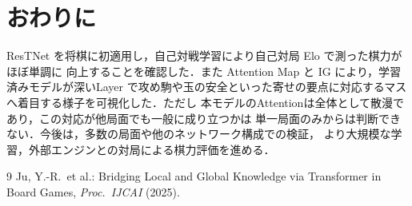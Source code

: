 \documentclass[a4paper,10pt,twocolumn]{ltjsarticle}
\begin{document}
\section{おわりに}
ResTNet を将棋に初適用し，自己対戦学習により自己対局 Elo で測った棋力がほぼ単調に
向上することを確認した．また Attention Map と IG により，学習済みモデルが深いLayer
で攻め駒や玉の安全といった寄せの要点に対応するマスへ着目する様子を可視化した．ただし
本モデルのAttentionは全体として散漫であり，この対応が他局面でも一般に成り立つかは
単一局面のみからは判断できない．今後は，多数の局面や他のネットワーク構成での検証，
より大規模な学習，外部エンジンとの対局による棋力評価を進める．

\begin{thebibliography}{9}
\small
{} Ju, Y.-R.\ et al.: Bridging Local and Global Knowledge via
  Transformer in Board Games, \textit{Proc.\ IJCAI} (2025).
\end{thebibliography}
\end{document}
